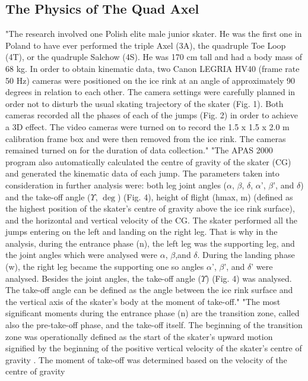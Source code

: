 \documentclass[12pt,journal,compsoc]{IEEEtran}
\begin{document}
\subsection{The Physics of The Quad Axel}
"The research involved one Polish elite male junior skater.
He was the first one in Poland to have ever performed the triple Axel (3A), the quadruple Toe Loop (4T), or the quadruple
Salchow (4S). He was 170 cm tall and had a body mass of 68 kg.
In order to obtain kinematic data, two Canon LEGRIA HV40
(frame rate 50 Hz) cameras were positioned on the ice rink at an
angle of approximately 90 degrees in relation to each other. The
camera settings were carefully planned in order not to disturb
the usual skating trajectory of the skater (Fig. 1). Both cameras
recorded all the phases of each of the jumps (Fig. 2) in order to
achieve a 3D effect. The video cameras were turned on to record
the 1.5 x 1.5 x 2.0 m calibration frame box and were then removed from the ice rink. The cameras remained turned on for
the duration of data collection." \cite{Axel}
"The APAS 2000 program also automatically calculated the
centre of gravity of the skater (CG) and generated the kinematic
data of each jump. The parameters taken into consideration in
further analysis were: both leg joint angles ($\alpha$, $\beta$, $\delta$, $\alpha$’, $\beta$’, and $\delta$)
and the take-off angle ($\Upsilon$, $\deg$) (Fig. 4), height of flight (hmax, m)
(defined as the highest position of the skater’s centre of gravity
above the ice rink surface), and the horizontal %
and
vertical velocity %
of the CG.
The skater performed all the jumps entering on the left and
landing on the right leg. That is why in the analysis, during the
entrance phase (n), the left leg was the supporting leg, and the
joint angles which were analysed were $\alpha$, $\beta$,and $\delta$. During the landing phase (w), the right leg became the supporting one so angles $\alpha$’, $\beta$’, and $\delta$’ were analysed.
Besides the joint angles, the take-off angle ($\Upsilon$) (Fig. 4) was
analysed. The take-off angle can be defined as the angle between
the ice rink surface and the vertical axis of the skater’s body at
the moment of take-off."
"The most significant moments during the entrance phase
(n) are the transition zone, called also the pre-take-off phase,
and the take-off itself. The beginning of the transition zone was
operationally defined as the start of the skater’s upward motion
signified by the beginning of the positive vertical velocity of the
skater’s centre of gravity %
. The moment of take-off was determined based on the velocity of the centre of gravity %
\end{document}
